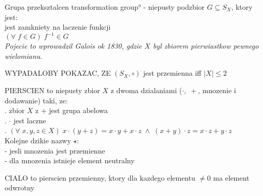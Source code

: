 \begin{multicols}{2}
    {\color{def}Grupa przeksztalcen} \ang{transformation group} - niepusty podzbior $G\subseteq S_X$, ktory jest:\\
        \point jest zamkniety na laczenie funkcji\\
        \point $(\forall\;f\in G)\;f^{-1}\in G$\\
    \emph{Pojecie to wprowadzil Galois ok 1830, gdzie $X$ byl zbiorem pierwiastkow pewnego wielomianu.}
    \bigskip

    {\color{cyan}WYPADALOBY POKAZAC, ZE $(S_X, \circ)$ jest przemienna iff $|X|\leq2$}

    {\color{def}PIERSCIEN} to niepusty zbior $X$ z dwoma dzialaniami ($\cdot,\;+$, mnozenie i dodawanie) taki, ze:\smallskip\\
    . zbior $X$ z $+$ jest grupa abelowa\smallskip\\
    . $\cdot$ jest laczne\smallskip\\
    . $(\forall\;x,y,z\in X)\;x\cdot(y+z)=x\cdot y+x\cdot z\;\land\;(x+y)\cdot z=x\cdot z+y\cdot z$\smallskip\\
    Kolejne dzikie nazwy $\star$:\smallskip\\
     - jesli mnozenia jest przemienne\smallskip\\
     - dla mnozenia istnieje element neutralny\medskip

    {\color{def}CIALO} to pierscien przemienny, ktory dla kazdego elementu $\neq 0$ ma element odwrotny

\end{multicols}\bigskip

\bigskip

